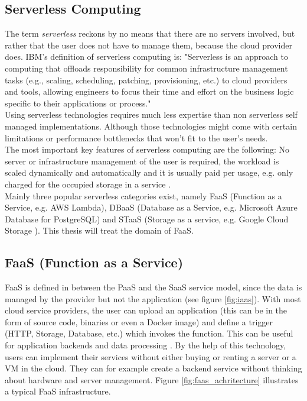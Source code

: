 \subsection{Serverless Computing}
\label{sec:serverless}
The term \textit{serverless} reckons by no means that there are no servers involved, but rather that the user does not have to manage them, because the cloud provider does.
\gls{IBM}'s definition of serverless computing is: "Serverless is an approach to computing that offloads responsibility for common infrastructure management tasks (e.g., scaling, scheduling, patching, provisioning, etc.) to cloud providers and tools, allowing engineers to focus their time and effort on the business logic specific to their applications or process." \cite{serverlessibm}\\
Using serverless technologies requires much less expertise than non serverless self managed implementations. Although those technologies might come with certain limitations or performance bottlenecks that won't fit to the user's needs.\\
The most important key features of serverless computing are the following: No server or infrastructure management of the user is required, the workload is scaled dynamically and automatically and it is usually paid per usage, e.g. only charged for the occupied storage in a service \cite{serverlessaws, serverlessazure}.\\
Mainly three popular serverless categories exist, namely FaaS (Function as a Service, e.g. \gls{AWS} Lambda), DBaaS (Database as a Service, e.g. Microsoft Azure Database for PostgreSQL) and STaaS (Storage as a service, e.g. Google Cloud Storage \cite{serverlessgoogle}). This thesis will treat the domain of FaaS.
\subsection{FaaS (Function as a Service)}
\gls{FaaS} is defined in between the \gls{PaaS} and the \gls{SaaS} service model, since the data is managed by the provider but not the application (see figure \ref{fig:iaas}). With most cloud service providers, the user can upload an application (this can be in the form of source code, binaries or even a Docker image) and define a trigger (\gls{HTTP}, Storage, Database, etc.) which invokes the function. This can be useful for application backends and data processing \cite{AWSLambda, GoogleFunctions}. By the help of this technology, users can implement their services without either buying or renting a server or a \gls{VM} in the cloud. They can for example create a backend service without thinking about hardware and server management. Figure \ref{fig:faas_achritecture} illustrates a typical \gls{FaaS} infrastructure.

